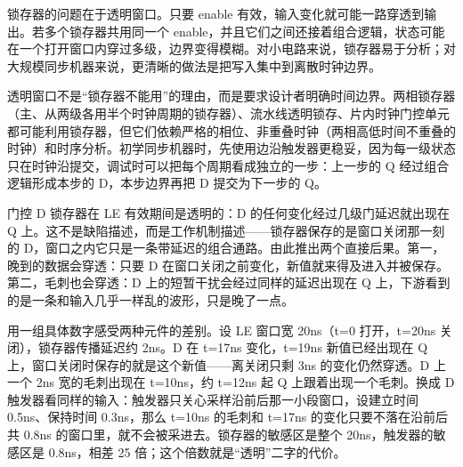 锁存器的问题在于透明窗口。只要 enable 有效，输入变化就可能一路穿透到输出。若多个锁存器共用同一个 enable，并且它们之间还接着组合逻辑，状态可能在一个打开窗口内穿过多级，边界变得模糊。对小电路来说，锁存器易于分析；对大规模同步机器来说，更清晰的做法是把写入集中到离散时钟边界。

透明窗口不是“锁存器不能用”的理由，而是要求设计者明确时间边界。两相锁存器（主、从两级各用半个时钟周期的锁存器）、流水线透明锁存、片内时钟门控单元都可能利用锁存器，但它们依赖严格的相位、非重叠时钟（两相高低时间不重叠的时钟）和时序分析。初学同步机器时，先使用边沿触发器更稳妥，因为每一级状态只在时钟沿提交，调试时可以把每个周期看成独立的一步：上一步的 Q 经过组合逻辑形成本步的 D，本步边界再把 D 提交为下一步的 Q。


门控 D 锁存器在 LE 有效期间是透明的：D 的任何变化经过几级门延迟就出现在 Q 上。这不是缺陷描述，而是工作机制描述——锁存器保存的是窗口关闭那一刻的 D，窗口之内它只是一条带延迟的组合通路。由此推出两个直接后果。第一，晚到的数据会穿透：只要 D 在窗口关闭之前变化，新值就来得及进入并被保存。第二，毛刺也会穿透：D 上的短暂干扰会经过同样的延迟出现在 Q 上，下游看到的是一条和输入几乎一样乱的波形，只是晚了一点。

用一组具体数字感受两种元件的差别。设 LE 窗口宽 20ns（t=0 打开，t=20ns 关闭），锁存器传播延迟约 2ns。D 在 t=17ns 变化，t=19ns 新值已经出现在 Q 上，窗口关闭时保存的就是这个新值——离关闭只剩 3ns 的变化仍然穿透。D 上一个 2ns 宽的毛刺出现在 t=10ns，约 t=12ns 起 Q 上跟着出现一个毛刺。换成 D 触发器看同样的输入：触发器只关心采样沿前后那一小段窗口，设建立时间 0.5ns、保持时间 0.3ns，那么 t=10ns 的毛刺和 t=17ns 的变化只要不落在沿前后共 0.8ns 的窗口里，就不会被采进去。锁存器的敏感区是整个 20ns，触发器的敏感区是 0.8ns，相差 25 倍；这个倍数就是“透明”二字的代价。

